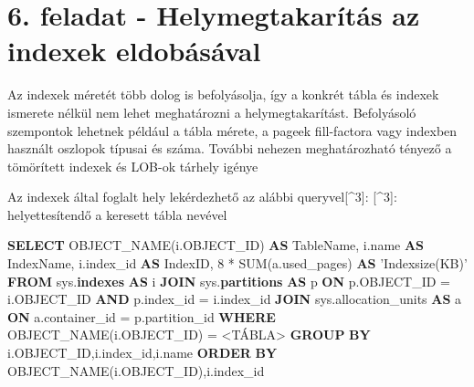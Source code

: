 \documentclass[
]{article}
\newenvironment{Shaded}{\begin{snugshade}}{\end{snugshade}}
\newcommand{\DecValTok}[1]{\textcolor[rgb]{0.25,0.63,0.44}{#1}}
\newcommand{\FunctionTok}[1]{\textcolor[rgb]{0.02,0.16,0.49}{#1}}
\newcommand{\KeywordTok}[1]{\textcolor[rgb]{0.00,0.44,0.13}{\textbf{#1}}}
\newcommand{\NormalTok}[1]{#1}
\newcommand{\OperatorTok}[1]{\textcolor[rgb]{0.40,0.40,0.40}{#1}}
\newcommand{\StringTok}[1]{\textcolor[rgb]{0.25,0.44,0.63}{#1}}
\begin{document}
\hypertarget{feladat---helymegtakaruxedtuxe1s-az-indexek-eldobuxe1suxe1val}{%
\section{6. feladat - Helymegtakarítás az indexek
eldobásával}\label{feladat---helymegtakaruxedtuxe1s-az-indexek-eldobuxe1suxe1val}}

Az indexek méretét több dolog is befolyásolja, így a konkrét tábla és
indexek ismerete nélkül nem lehet meghatározni a helymegtakarítást.
Befolyásoló szempontok lehetnek például a tábla mérete, a pageek
fill-factora vagy indexben használt oszlopok típusai és száma. További
nehezen meghatározható tényező a tömörített indexek és LOB-ok tárhely
igénye

Az indexek által foglalt hely lekérdezhető az alábbi
queryvel{[}\^{}3{]}: {[}\^{}3{]}: \emph{} helyettesítendő a keresett
tábla nevével

\begin{Shaded}
\begin{Highlighting}[]
\KeywordTok{SELECT}
\NormalTok{OBJECT_NAME(i.OBJECT_ID) }\KeywordTok{AS}\NormalTok{ TableName,}
\NormalTok{i.name }\KeywordTok{AS}\NormalTok{ IndexName,}
\NormalTok{i.index_id }\KeywordTok{AS}\NormalTok{ IndexID,}
\DecValTok{8} \OperatorTok{*} \FunctionTok{SUM}\NormalTok{(a.used_pages) }\KeywordTok{AS} \StringTok{'Indexsize(KB)'}
\KeywordTok{FROM}\NormalTok{ sys.}\KeywordTok{indexes} \KeywordTok{AS}\NormalTok{ i}
\KeywordTok{JOIN}\NormalTok{ sys.}\KeywordTok{partitions} \KeywordTok{AS}\NormalTok{ p }\KeywordTok{ON}\NormalTok{ p.OBJECT_ID }\OperatorTok{=}\NormalTok{ i.OBJECT_ID }\KeywordTok{AND}\NormalTok{ p.index_id }\OperatorTok{=}\NormalTok{ i.index_id}
\KeywordTok{JOIN}\NormalTok{ sys.allocation_units }\KeywordTok{AS}\NormalTok{ a }\KeywordTok{ON}\NormalTok{ a.container_id }\OperatorTok{=}\NormalTok{ p.partition_id}
\KeywordTok{WHERE}\NormalTok{ OBJECT_NAME(i.OBJECT_ID) }\OperatorTok{=} \OperatorTok{<}\NormalTok{TÁBLA}\OperatorTok{>}
\KeywordTok{GROUP} \KeywordTok{BY}\NormalTok{ i.OBJECT_ID,i.index_id,i.name}
\KeywordTok{ORDER} \KeywordTok{BY}\NormalTok{ OBJECT_NAME(i.OBJECT_ID),i.index_id}
\end{Highlighting}
\end{Shaded}

\hypertarget{section}{%
\section{}\label{section}}
\end{document}
